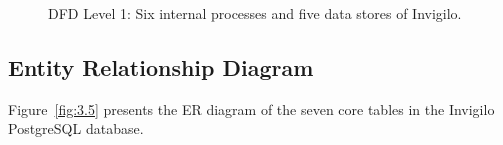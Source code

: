 \documentclass[12pt, a4paper]{report}
\begin{document}
\begin{figure}[t]
\caption{DFD Level 1: Six internal processes and five data stores of Invigilo.}
\label{fig:3.4}
\end{figure}

\subsection{Entity Relationship Diagram}

\begin{justify}
  {\fontsize{12}{18}\selectfont
    Figure~\ref{fig:3.5} presents the ER diagram of the seven core tables in the Invigilo PostgreSQL database.
  }
\end{justify}
\end{document}
